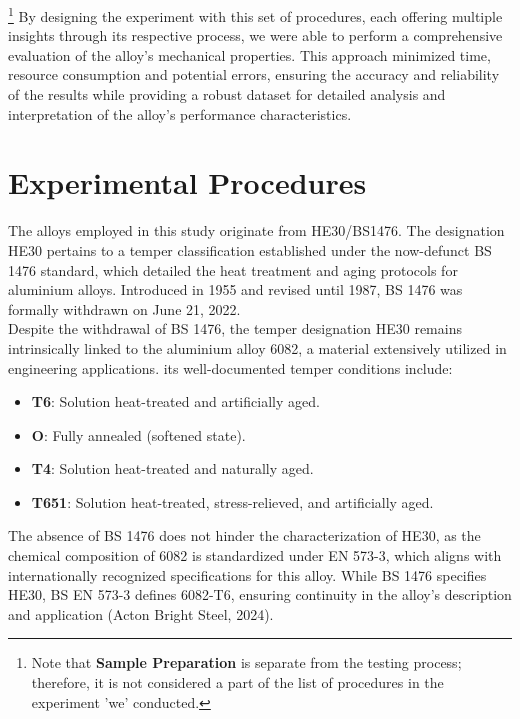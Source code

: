 \documentclass{article}
\begin{document}
\footnote{Note that \textbf{Sample Preparation} is separate from the testing process; therefore, it is not considered a part of the list of procedures in the experiment 'we' conducted.} By designing the experiment with this set of procedures, each offering multiple insights through its respective process, we were able to perform a comprehensive evaluation of the alloy's mechanical properties. This approach minimized time, resource consumption and potential errors, ensuring the accuracy and reliability of the results while providing a robust dataset for detailed analysis and interpretation of the alloy's performance characteristics.

\newpage

\section{Experimental Procedures}
The alloys employed in this study originate from HE30/BS1476. The designation HE30 pertains to a temper classification established under the now-defunct BS 1476 standard, which detailed the heat treatment and aging protocols for aluminium alloys. Introduced in 1955 and revised until 1987, BS 1476 was formally withdrawn on June 21, 2022.\\[8pt]
Despite the withdrawal of BS 1476, the temper designation HE30 remains intrinsically linked to the aluminium alloy 6082, a material extensively utilized in engineering applications. its well-documented temper conditions include:
\begin{itemize}[itemsep=1pt]
    \item \textbf{T6}: Solution heat-treated and artificially aged.
    \item \textbf{O}: Fully annealed (softened state).
    \item \textbf{T4}: Solution heat-treated and naturally aged.
    \item \textbf{T651}: Solution heat-treated, stress-relieved, and artificially aged.
\end{itemize}
The absence of BS 1476 does not hinder the characterization of HE30, as the chemical composition of 6082 is standardized under EN 573-3, which aligns with internationally recognized specifications for this alloy. While BS 1476 specifies HE30, BS EN 573-3 defines 6082-T6, ensuring continuity in the alloy's description and application (Acton Bright Steel, 2024).
\end{document}
